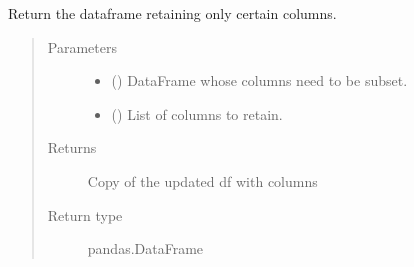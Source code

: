 \documentclass[letterpaper,10pt,openany,oneside,english]{sphinxmanual}
\begin{document}
\begin{fulllineitems}
\label{\detokenize{index:loadPullDataAnalysis.dataXformation.dfWithCols}}
\sphinxAtStartPar
Return the dataframe retaining only certain columns.
\begin{quote}\begin{description}
\item[{Parameters}] \leavevmode\begin{itemize}
\item {} 
\sphinxAtStartPar
{} () \textendash{} DataFrame whose columns need to be subset.

\item {} 
\sphinxAtStartPar
{} (\sphinxstyleliteralemphasis{\sphinxupquote{{[}}}\sphinxstyleliteralemphasis{\sphinxupquote{{]}}}) \textendash{} List of columns to retain.

\end{itemize}

\item[{Returns}] \leavevmode
\sphinxAtStartPar
Copy of the updated df with columns

\item[{Return type}] \leavevmode
\sphinxAtStartPar
pandas.DataFrame

\end{description}\end{quote}

\end{fulllineitems}

\end{document}
